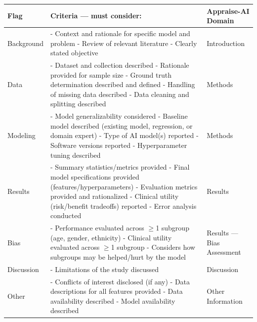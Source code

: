 \begin{tabular}{@{}p{2.2cm}p{9.5cm}p{2.3cm}@{}}
    \toprule
    \textbf{Flag} & \textbf{Criteria — must consider:} & \textbf{Appraise-AI Domain} \\
    \midrule
    Background &
    - Context and rationale for specific model and problem \newline
    - Review of relevant literature \newline
    - Clearly stated objective
    & Introduction \\
    \addlinespace
    Data &
    - Dataset and collection described \newline
    - Rationale provided for sample size \newline
    - Ground truth determination described and defined \newline
    - Handling of missing data described \newline
    - Data cleaning and splitting described
    & Methods \\
    \addlinespace
    Modeling &
    - Model generalizability considered \newline
    - Baseline model described (existing model, regression, or domain expert) \newline
    - Type of AI model(s) reported \newline
    - Software versions reported \newline
    - Hyperparameter tuning described
    & Methods \\
    \addlinespace
    Results &
    - Summary statistics/metrics provided \newline
    - Final model specifications provided \newline
    (features/hyperparameters) \newline
    - Evaluation metrics provided and rationalized \newline
    - Clinical utility (risk/benefit tradeoffs) reported \newline
    - Error analysis conducted
    & Results \\
    \addlinespace
    Bias &
    - Performance evaluated across $\geq$1 subgroup (age, gender, ethnicity) \newline
    - Clinical utility evaluated across $\geq$1 subgroup \newline
    - Considers how subgroups may be helped/hurt by the model
    & Results — Bias Assessment \\
    \addlinespace
    Discussion &
    - Limitations of the study discussed
    & Discussion \\
    \addlinespace
    Other &
    - Conflicts of interest disclosed (if any) \newline
    - Data descriptions for all features provided \newline
    - Data availability described \newline
    - Model availability described
    & Other Information \\
    \bottomrule
    \end{tabular}